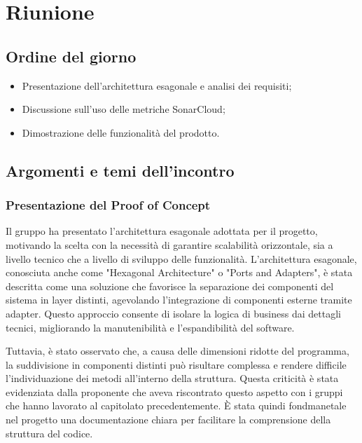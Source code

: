 \section{Riunione}
\subsection{Ordine del giorno}
\begin{itemize}
    \item Presentazione dell'architettura esagonale e analisi dei requisiti;
    \item Discussione sull'uso delle metriche SonarCloud;
    \item Dimostrazione delle funzionalità del prodotto.
\end{itemize}

\subsection{Argomenti e temi dell'incontro}

\subsubsection{Presentazione del Proof of Concept}

\par Il gruppo ha presentato l'architettura esagonale adottata per il progetto, motivando la scelta con la necessità di garantire scalabilità orizzontale, sia a livello tecnico che a livello di sviluppo delle funzionalità. L'architettura esagonale, conosciuta anche come "Hexagonal Architecture" o "Ports and Adapters", è stata descritta come una soluzione che favorisce la separazione dei componenti del sistema in layer distinti, agevolando l'integrazione di componenti esterne tramite adapter. Questo approccio consente di isolare la logica di business dai dettagli tecnici, migliorando la manutenibilità e l'espandibilità del software.

\par Tuttavia, è stato osservato che, a causa delle dimensioni ridotte del programma, la suddivisione in componenti distinti può risultare complessa e rendere difficile l'individuazione dei metodi all'interno della struttura. Questa criticità è stata evidenziata dalla proponente che aveva riscontrato questo aspetto con i gruppi che hanno lavorato al capitolato precedentemente. È stata quindi fondmanetale nel progetto una documentazione chiara per facilitare la comprensione della struttura del codice.


